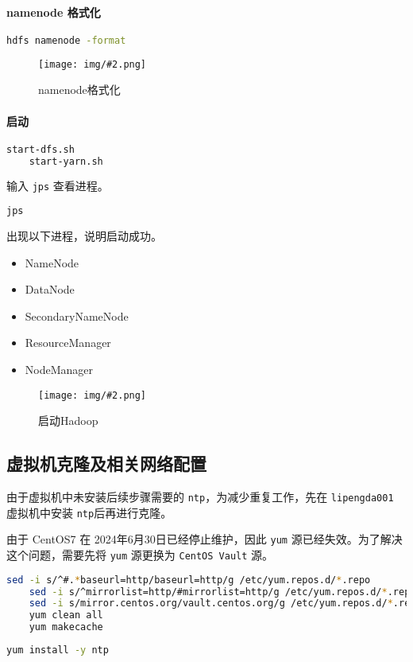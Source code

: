\documentclass{article}
\newcommand{\notebox}[2][NOTE]{%
    \begin{tcolorbox}[
        colback=cyan!5!white,          
        colframe=cyan!50!black,       
        fonttitle=\bfseries\large,   
        coltitle=white,               
        title=#1,
        rounded corners,              
        boxrule=1.5pt,                
        width=\textwidth,            
        drop shadow=black!30,         
        enhanced,                  
    ]
    #2
    \end{tcolorbox}
}
\newcommand{\img}[3][0.9]{%
    \begin{figure}[H]
        \centering
        \texttt{[image: img/\#2.png]}
        \caption{#3}
    \end{figure}
}
\newcommand{\subsubsubsection}[1]{\paragraph{#1}\mbox{}}
\begin{document}
\subsubsubsection{namenode 格式化}

\begin{lstlisting}[language=bash]
    hdfs namenode -format
\end{lstlisting}

\img{3.2.1.1}{namenode格式化}

\subsubsubsection{启动}

\begin{lstlisting}[language=bash]
    start-dfs.sh
    start-yarn.sh
\end{lstlisting}

输入 \texttt{jps} 查看进程。

\begin{lstlisting}[language=bash]
    jps
\end{lstlisting}

出现以下进程，说明启动成功。

\begin{itemize}[noitemsep]
    \item NameNode
    \item DataNode
    \item SecondaryNameNode
    \item ResourceManager
    \item NodeManager
\end{itemize}

\img{0.3.2.2.1}{启动Hadoop}

\subsection{虚拟机克隆及相关网络配置}

\notebox{
    由于虚拟机中未安装后续步骤需要的 \texttt{ntp}，为减少重复工作，先在 \texttt{lipengda001} 虚拟机中安装 \texttt{ntp}后再进行克隆。
}
    
\notebox{
    由于 CentOS7 在 2024年6月30日已经停止维护，因此 \texttt{yum} 源已经失效。为了解决这个问题，需要先将 \texttt{yum} 源更换为 \texttt{CentOS Vault} 源。
}

\begin{lstlisting}[language=bash]
    sed -i s/^#.*baseurl=http/baseurl=http/g /etc/yum.repos.d/*.repo
    sed -i s/^mirrorlist=http/#mirrorlist=http/g /etc/yum.repos.d/*.repo
    sed -i s/mirror.centos.org/vault.centos.org/g /etc/yum.repos.d/*.repo
    yum clean all
    yum makecache
\end{lstlisting}

\begin{lstlisting}[language=bash]
    yum install -y ntp
\end{lstlisting}
\end{document}

